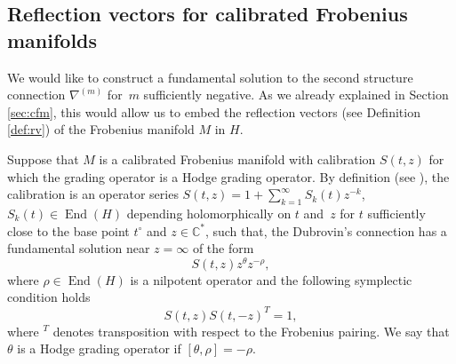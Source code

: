 \documentclass[10pt,a4paper]{article}
\numberwithin{equation}{section}
\newcommand{\CC}{\mathbb{C}}
\begin{document}
\subsection{Reflection vectors for calibrated Frobenius
 manifolds}\label{sec:pv}
We would like to construct a fundamental solution to the second
structure connection $\nabla^{(m)}$ for~$m$ sufficiently negative. As
we already explained in Section \ref{sec:cfm}, this would allow us to
embed the reflection vectors (see Definition \ref{def:rv}) of the
Frobenius manifold $M$ in $H$.

Suppose that $M$ is a calibrated Frobenius manifold with calibration
$S(t,z)$ for which the grading operator is a Hodge grading operator.
By definition (see \cite{Givental:qqh}), the calibration is an
operator series $S(t,z)=1+\sum_{k=1}^\infty S_k(t)z^{-k}$, $S_k(t)\in
\operatorname{End}(H)$ depending holomorphically on $t$ and~$z$ for
$t$ sufficiently close to the base point $t^\circ$ and $z\in \CC^*$,
such that, the Dubrovin's connection has a fundamental solution near
$z=\infty$ of the form
\[
S(t,z) z^{\theta} z^{-\rho},
\]
where $\rho\in \operatorname{End}(H)$ is a nilpotent operator
and the following symplectic condition holds
\[
S(t,z)S(t,-z)^T=1,
\]
where ${}^T$ denotes transposition with respect to the Frobenius
pairing. We say that $\theta$ is a Hodge grading operator if
$[\theta,\rho]=-\rho$.
\end{document}
